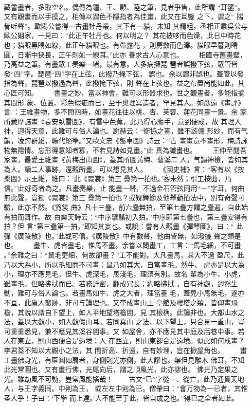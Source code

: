 \documentclass{ctexart}
\begin{document}
\paragraph{}
藏書畫者，多取空名。偶傳為鐘、王、顧、陸之筆，見者爭售，此所謂 ``耳鑒''。又有觀畫而以手摸之，相傳以謂色不隱指者為佳畫，此又在耳鑒 之下，謂之`` 揣骨听聲''。歐陽公嘗得一古畫牡丹叢，其下有一貓，未知 其精粗。丞相正肅吳公与歐公姻家，一見曰：``此正午牡丹也。何以明之？ 其花披哆而色燥，此日中時花也；貓眼黑睛如線，此正午貓眼也。有帶露花 ，則房斂而色澤。貓眼早暮則睛圓，日漸中狹長，正午則如一線耳。''此亦 善求古人心意也。 　　相國寺舊畫壁，乃高益之筆。有畫眾工奏樂一堵，最有意。人多病擁琵 琶者誤撥下弦，眾管皆發``四''字。琵琶``四''字在上弦，此撥乃掩下弦， 誤也。余以謂非誤也。蓋管以發指為聲，琵琶以撥過為聲，此撥掩下弦，則 聲在上弦也。益之布置尚能如此，其心匠可知。 　　書畫之妙，當以神會，難可以形器求也。世之觀畫者，多能指摘其間形 象、位置、彩色瑕疵而已，至于奧理冥造者，罕見其人。如彥遠《畫評》言 ：王維畫物，多不問四時，如畫花往往以桃、杏、芙蓉、蓮花同畫一景。余 家所藏摩詰畫《袁安臥雪圖》，有雪中芭蕉，此乃得心應手，意到便成，故 其理入神，迥得天意，此難可与俗人論也。謝赫云：``衛協之畫，雖不該備 形妙，而有气韻，凌跨群雄，曠代絕筆。''又歐文忠《盤車圖》詩云：``古 畫畫意不畫形，梅詩詠物無隱情。忘形得意知者寡，不若見詩如見畫。''此 真為識畫也。 　　王仲至閱吾家畫，最愛王維畫《黃梅出山圖》，蓋其所圖黃梅、曹溪二 人，气韻神檢，皆如其為人。讀二人事跡，還觀所畫，可以想見其人。 　　《國史補》言：``客有以《按樂圖》示王維，維曰：`此《霓裳》第三 疊第一拍也。'客未然；引工按曲，乃信。''此好奇者為之。凡畫奏樂，止 能畫一聲，不過金石管弦同用``一''字耳，何曲無此聲，豈獨《霓裳》第三 疊第一拍也？或疑舞節及他舉動拍法中，別有奇聲可驗，此亦不然。《霓裳 曲》凡十三疊，前六疊無拍，至第七疊方謂之疊遍，自此始有拍而舞作。故 白樂天詩云：``中序擘騞初入拍。''中序即第七疊也，第三疊安得有拍？但 言``第三疊第一拍，''即知其妄也。或說：嘗有人觀畫《彈琴圖》，曰：`` 此彈《廣陵散》也。''此或可信。《廣陵散》中有數聲，他曲皆無，如潑攦 聲之類是也。 　　畫牛、虎皆畫毛，惟馬不畫。余嘗以問畫工，工言：``馬毛細，不可畫 。''余難之曰：``鼠毛更細，何故卻畫？''工不能對。大凡畫馬，其大不過 盈尺，此乃以大為小，所以毛細而不可畫；鼠乃如其大，自當畫毛。然牛、 虎亦是以大為小，理亦不應見毛，但牛、虎深毛，馬淺毛，理須有別。故名 輩為小牛、小虎，雖畫毛，但略拂拭而已。若務詳密，翻成冗長；約略拂拭 ，自有神觀，迥然生動，難可与俗人論也。若畫馬如牛、虎之大者，理當畫 毛，蓋見小馬無毛，遂亦不亘，此庸人襲跡，非可与論理也。又李成畫山上 亭館及樓塔之類，皆仰畫飛檐，其說以謂自下望上，如人平地望塔檐間，見 其榱桷。此論非也。大都山水之法，蓋以大觀小，如人觀假山耳。若同真山 之法，以下望上，只合見一重山，豈可重重悉見，兼不應見其溪谷間事。又 如屋舍，亦不應見其中庭及后巷中事。若人在東立，則山西便合是遠境；人 在西立，則山東卻合是遠境。似此如何成畫？李君蓋不知以大觀小之法，其 間折高、折遠，自有妙理，豈在掀屋角也。 　　畫工畫佛身光，有匾圓如扇者，身側則光亦側，此大謬也。渠但見雕木 佛耳，不知此光常圓也。又有畫行佛，光尾向后，謂之順風光，此亦謬也。 佛光乃定果之光。雖劫風不可動，豈常風能搖哉！ 　　古文``已''字從一、從亡，此乃通貫天地人，与王字義同。中則為王， 或左左中則為已。僧肇曰：``會万物為一已者，其惟圣人乎！子曰：`下學 而上達。'人不能至于此，皆自成之也。''得已之全者如此。 
\end{document}
